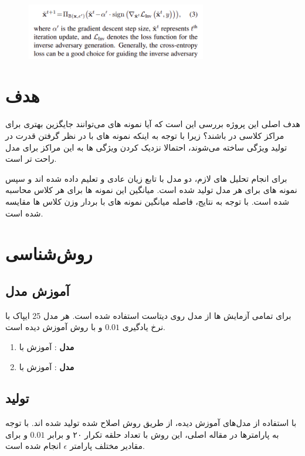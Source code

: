 \documentclass{article}
\begin{document}
\begin{figure}[h]
    \centering
    \includegraphics[width=0.7\textwidth]{pgd.png}
    \label{fig:sample_figure}
\end{figure}

\section{هدف}
هدف اصلی این پروژه بررسی این است که آیا نمونه های  می‌توانند جایگزین بهتری برای مراکز کلاسی در  باشند؟
زیرا با توجه به اینکه نمونه های  با در نظر گرفتن قدرت  در تولید ویژگی ساخته می‌شوند، احتمالا نزدیک کردن ویژگی ها به این مراکز برای مدل راحت تر است.

برای انجام تحلیل های لازم، دو مدل با تابع زیان عادی و  تعلیم داده شده اند و سپس نمونه های  برای هر مدل تولید شده است. میانگین این نمونه ها برای هر کلاس محاسبه شده است. با توجه به نتایج، فاصله میانگین نمونه های  با بردار وزن کلاس ها مقایسه شده است.

\section{روش‌شناسی}
\subsection{آموزش مدل}
برای تمامی آزمایش ها از مدل  روی دیتاست  استفاده شده است. هر مدل 25 ایپاک با نرخ یادگیری $0.01$ و با روش  آموزش دیده است.

\begin{enumerate}
    \item \textbf{مدل }: آموزش با 
    \item \textbf{مدل }:  آموزش با 
\end{enumerate}

\subsection{تولید }
با استفاده از مدل‌های آموزش دیده،  از طریق روش  اصلاح شده تولید شده اند.
با توجه به پارامترها در مقاله اصلی، این روش با تعداد حلقه تکرار ۲۰ و  برابر $0.01$ و برای مقادیر مختلف پارامتر $\epsilon$ انجام شده است.
\end{document}
